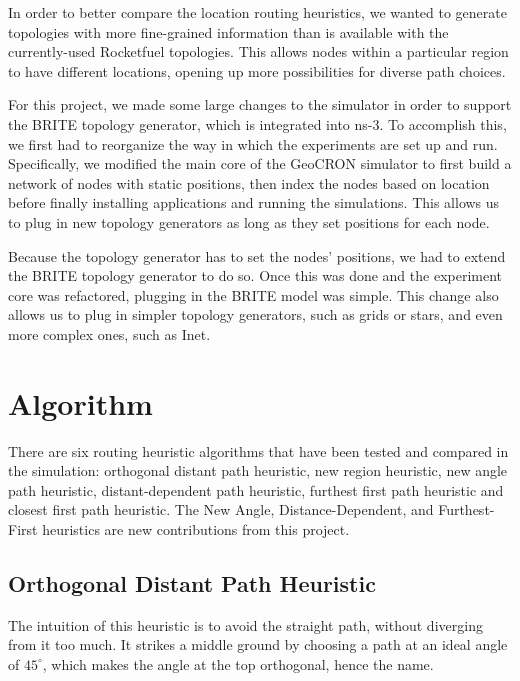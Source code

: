 \documentclass[conference]{IEEEtran}
\begin{document}
In order to better compare the location routing heuristics, we wanted to generate topologies with more fine-grained information than is available with the currently-used Rocketfuel topologies.
This allows nodes within a particular region to have different locations, opening up more possibilities for diverse path choices.

For this project, we made some large changes to the simulator in order to support the BRITE \cite{brite} topology generator, which is integrated into ns-3.
To accomplish this, we first had to reorganize the way in which the experiments are set up and run.
Specifically, we modified the main core of the GeoCRON simulator to first build a network of nodes with static positions, then index the nodes based on location before finally installing applications and running the simulations.
This allows us to plug in new topology generators as long as they set positions for each node.

Because the topology generator has to set the nodes' positions, we had to extend the BRITE topology generator to do so.
Once this was done and the experiment core was refactored, plugging in the BRITE model was simple.
This change also allows us to plug in simpler topology generators, such as grids or stars, and even more complex ones, such as Inet.



\section{Algorithm}
There are six routing heuristic algorithms that have been tested and compared in the simulation: orthogonal distant path heuristic, new region heuristic, new angle path heuristic, distant-dependent path heuristic, furthest first path heuristic and closest first path heuristic.
The New Angle, Distance-Dependent, and Furthest-First heuristics are new contributions from this project.

%
\subsection{Orthogonal Distant Path Heuristic}
The intuition of this heuristic is to avoid the straight path, without diverging from it too much.  It strikes a middle ground by choosing a path at an ideal angle of $45^{\circ}$, which makes the angle at the top orthogonal, hence the name.
\begin{algorithm}
\DontPrintSemicolon
{}
\SetAlgoLined
\SetAlgoLongEnd
\scriptsize
{}
\caption{}
\small
\end{algorithm}
\end{document}
